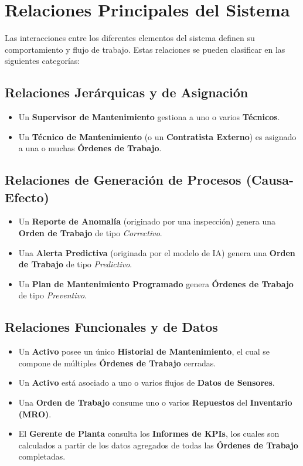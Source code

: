 \section{Relaciones Principales del Sistema}

Las interacciones entre los diferentes elementos del sistema definen su comportamiento y flujo de trabajo. Estas relaciones se pueden clasificar en las siguientes categorías:

\subsection{Relaciones Jerárquicas y de Asignación}

\begin{itemize}
    \item Un \textbf{Supervisor de Mantenimiento} gestiona a uno o varios \textbf{Técnicos}.
    \item Un \textbf{Técnico de Mantenimiento} (o un \textbf{Contratista Externo}) es asignado a una o muchas \textbf{Órdenes de Trabajo}.
\end{itemize}

\subsection{Relaciones de Generación de Procesos (Causa-Efecto)}

\begin{itemize}
    \item Un \textbf{Reporte de Anomalía} (originado por una inspección) genera una \textbf{Orden de Trabajo} de tipo \textit{Correctivo}.
    \item Una \textbf{Alerta Predictiva} (originada por el modelo de IA) genera una \textbf{Orden de Trabajo} de tipo \textit{Predictivo}.
    \item Un \textbf{Plan de Mantenimiento Programado} genera \textbf{Órdenes de Trabajo} de tipo \textit{Preventivo}.
\end{itemize}

\subsection{Relaciones Funcionales y de Datos}

\begin{itemize}
    \item Un \textbf{Activo} posee un único \textbf{Historial de Mantenimiento}, el cual se compone de múltiples \textbf{Órdenes de Trabajo} cerradas.
    \item Un \textbf{Activo} está asociado a uno o varios flujos de \textbf{Datos de Sensores}.
    \item Una \textbf{Orden de Trabajo} consume uno o varios \textbf{Repuestos} del \textbf{Inventario (MRO)}.
    \item El \textbf{Gerente de Planta} consulta los \textbf{Informes de KPIs}, los cuales son calculados a partir de los datos agregados de todas las \textbf{Órdenes de Trabajo} completadas.
\end{itemize}
